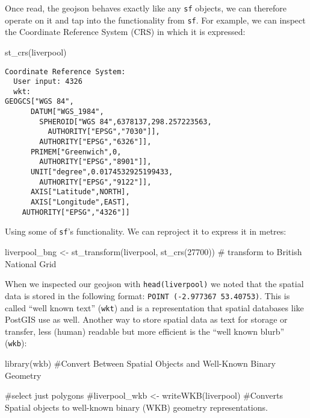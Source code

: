 \documentclass[
  letterpaper,
  DIV=11,
  numbers=noendperiod]{scrreprt}
\newenvironment{Shaded}{\begin{snugshade}}{\end{snugshade}}
\newcommand{\CommentTok}[1]{\textcolor[rgb]{0.37,0.37,0.37}{#1}}
\newcommand{\DecValTok}[1]{\textcolor[rgb]{0.68,0.00,0.00}{#1}}
\newcommand{\FunctionTok}[1]{\textcolor[rgb]{0.28,0.35,0.67}{#1}}
\newcommand{\NormalTok}[1]{\textcolor[rgb]{0.00,0.23,0.31}{#1}}
\newcommand{\OtherTok}[1]{\textcolor[rgb]{0.00,0.23,0.31}{#1}}
\begin{document}
Once read, the geojson behaves exactly like any \texttt{sf} objects, we
can therefore operate on it and tap into the functionality from
\texttt{sf}. For example, we can inspect the Coordinate Reference System
(CRS) in which it is expressed:

\begin{Shaded}
\begin{Highlighting}[]
\FunctionTok{st\_crs}\NormalTok{(liverpool)}
\end{Highlighting}
\end{Shaded}

\begin{verbatim}
Coordinate Reference System:
  User input: 4326 
  wkt:
GEOGCS["WGS 84",
      DATUM["WGS_1984",
        SPHEROID["WGS 84",6378137,298.257223563,
          AUTHORITY["EPSG","7030"]],
        AUTHORITY["EPSG","6326"]],
      PRIMEM["Greenwich",0,
        AUTHORITY["EPSG","8901"]],
      UNIT["degree",0.0174532925199433,
        AUTHORITY["EPSG","9122"]],
      AXIS["Latitude",NORTH],
      AXIS["Longitude",EAST],
    AUTHORITY["EPSG","4326"]]
\end{verbatim}

Using some of \texttt{sf}'s functionality. We can reproject it to
express it in metres:

\begin{Shaded}
\begin{Highlighting}[]
\NormalTok{liverpool\_bng }\OtherTok{\textless{}{-}} \FunctionTok{st\_transform}\NormalTok{(liverpool, }\FunctionTok{st\_crs}\NormalTok{(}\DecValTok{27700}\NormalTok{)) }\CommentTok{\# transform to British National Grid}
\end{Highlighting}
\end{Shaded}

When we inspected our geojson with \texttt{head(liverpool)} we noted
that the spatial data is stored in the following format:
\texttt{POINT\ (-2.977367\ 53.40753)}. This is called ``well known
text'' (\texttt{wkt}) and is a representation that spatial databases
like PostGIS use as well. Another way to store spatial data as text for
storage or transfer, less (human) readable but more efficient is the
``well known blurb'' (\texttt{wkb}):

\begin{Shaded}
\begin{Highlighting}[]
\FunctionTok{library}\NormalTok{(wkb) }\CommentTok{\#Convert Between Spatial Objects and Well{-}Known Binary Geometry}

\CommentTok{\#select just polygons}
\CommentTok{\#liverpool\_wkb \textless{}{-} writeWKB(liverpool) \#Converts Spatial objects to well{-}known binary (WKB) geometry representations.}
\end{Highlighting}
\end{Shaded}
\end{document}
